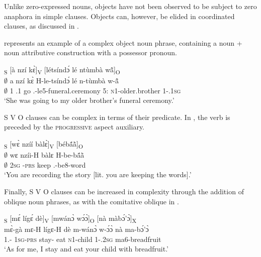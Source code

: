 Unlike zero-expressed nouns, objects have not been observed to be subject to zero anaphora in simple clauses. Objects can, however, be elided in coordinated clauses, as discussed in . 

 represents an example of a complex object noun phrase, containing a noun + noun attributive construction with a possessor pronoun.

\ea \label{SVO3}
  \glll [$\emptyset$]\textsubscript{S} [à nzí kɛ̀]\textsubscript{V} [létsíndɔ́ lé ntùmbà wã̂]\textsubscript{O} \\
      {\db}$\emptyset$  {\db}a nzí kɛ̀ {\db}H-le-tsíndɔ́ lé n-tùmbà w-ã̂ \\
       {\db}$\emptyset$  {\db}1 {\PROG}.{\PST}1 go {\db}{\OBJ}.{\LINK}-le5-funeral.ceremony 5:{\ATT} \textsc{n}1-older.brother 1-{\POSS}.1\textsc{sg}   \\
    \trans `She was going to my older brother's funeral ceremony.'
\z

S V O clauses can be complex in terms of their predicate. In , the verb is preceded by the \textsc{progressive} aspect auxiliary.

\ea \label{SVO4}
  \glll  [$\emptyset$]\textsubscript{S} [wɛ̀ nzíí bàlɛ̀]\textsubscript{V} [bébã́ã̀]\textsubscript{O} \\
    {\db}$\emptyset$  {\db}wɛ nzíi-H bàlɛ {\db}H-be-bã́ã̀ \\
      {\db}$\emptyset$      {\db}2\textsc{sg} {\PROG}-\textsc{prs} keep {\db}{\OBJ}.{\LINK}-be8-word\\
    \trans `You are recording the story [lit. you are keeping the words].'
\z

Finally, S V O clauses can be increased in complexity through the addition of oblique noun phrases, as with the comitative oblique in .


\ea \label{SVO5}
  \glll  [mɛ̀gà]\textsubscript{S} [mɛ́ lígɛ́ dè]\textsubscript{V} [mwánɔ̀ wɔ́ɔ̀]\textsubscript{O} [nà màbɔ́'ɔ̀]\textsubscript{X}  \\
        {\db}mɛ̀-gà {\db}mɛ-H lígɛ-H dè {\db}m-wánɔ̀ w-ɔ́ɔ̀ {\db}nà ma-bɔ́'ɔ̀ \\
          {\db}1.{\SBJ}-{\CONTR} {\db}1\textsc{sg}-\textsc{prs} stay-{\R} eat {\db}\textsc{n}1-child 1-{\POSS}.2\textsc{sg} {\db}{\COM} ma6-breadfruit\\
    \trans `As for me, I stay and eat your child with breadfruit.'
\z








